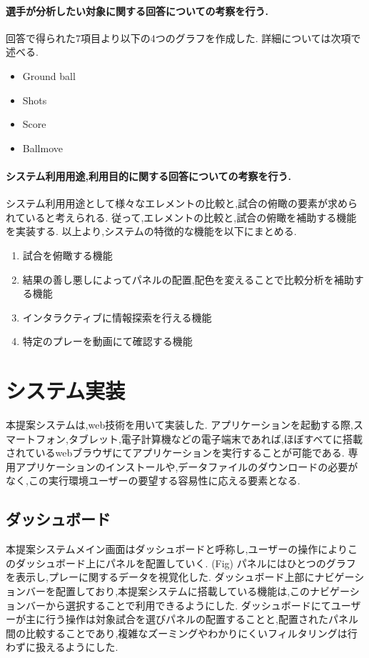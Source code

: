 \documentclass[sotsuron]{kuee}
\begin{document}
					\paragraph {選手が分析したい対象に関する回答についての考察を行う. }
						回答で得られた7項目より以下の4つのグラフを作成した. 詳細については次項で述べる. 
							\begin{itemize}
								\item Ground ball
								\item Shots
								\item Score
								\item Ballmove
							\end{itemize}
					\paragraph {システム利用用途,利用目的に関する回答についての考察を行う. }
						システム利用用途として様々なエレメントの比較と,試合の俯瞰の要素が求められていると考えられる. 
						従って,エレメントの比較と,試合の俯瞰を補助する機能を実装する. 
						以上より,システムの特徴的な機能を以下にまとめる. 
						\begin{enumerate}	
							\item 試合を俯瞰する機能
							\item 結果の善し悪しによってパネルの配置,配色を変えることで比較分析を補助する機能
							\item インタラクティブに情報探索を行える機能
							\item 特定のプレーを動画にて確認する機能
						\end{enumerate}
	\section{システム実装}
			本提案システムは,web技術を用いて実装した. 
			アプリケーションを起動する際,スマートフォン,タブレット,電子計算機などの電子端末であれば,ほぼすべてに搭載されているwebブラウザにてアプリケーションを実行することが可能である. 
			専用アプリケーションのインストールや,データファイルのダウンロードの必要がなく,この実行環境ユーザーの要望する容易性に応える要素となる. 
		\subsection{ダッシュボード}
			本提案システムメイン画面はダッシュボードと呼称し,ユーザーの操作によりこのダッシュボード上にパネルを配置していく. (Fig)
			パネルにはひとつのグラフを表示し,プレーに関するデータを視覚化した. 
			ダッシュボード上部にナビゲーションバーを配置しており,本提案システムに搭載している機能は,このナビゲーションバーから選択することで利用できるようにした. 
			ダッシュボードにてユーザーが主に行う操作は対象試合を選びパネルの配置することと,配置されたパネル間の比較することであり,複雑なズーミングやわかりにくいフィルタリングは行わずに扱えるようにした. 
\end{document}
